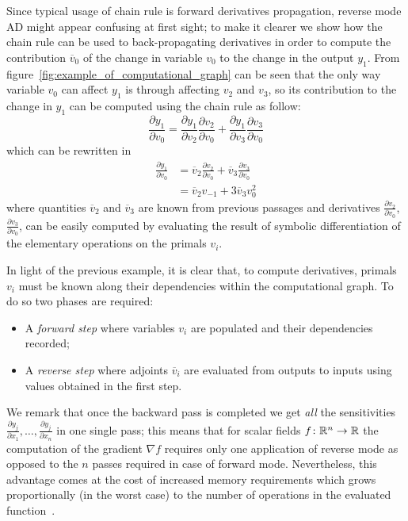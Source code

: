 \clearpage

Since typical usage of chain rule is forward derivatives propagation, reverse mode AD might appear confusing at first sight; to make it clearer we show how the chain rule can be used to back-propagating derivatives in order to compute the contribution $\overline{v}_0$ of the change in variable $v_0$ to the change in the output $y_1$. From figure~\ref{fig:example_of_computational_graph} can be seen that the only way variable $v_0$ can affect $y_1$ is through affecting $v_2$ and $v_3$, so its contribution to the change in $y_1$ can be computed using the chain rule as follow:
\begin{equation}
	\frac{\partial y_1}{\partial v_0} = \frac{\partial y_1}{\partial v_2} \frac{\partial v_2}{\partial v_0} + \frac{\partial y_1}{\partial v_3} \frac{\partial v_3}{\partial v_0}
\end{equation}
which can be rewritten in
\begin{equation}
	\begin{split}
		\frac{\partial y_1}{\partial v_0} & = \overline{v}_2 \frac{\partial v_2}{\partial v_0} + \overline{v}_3 \frac{\partial v_3}{\partial v_0}  \\[2ex]
										  & = \overline{v}_2 v_{-1} + 3 \overline{v}_3 v_0^2
	\end{split}
\end{equation}
where quantities $\overline{v}_2$ and $\overline{v}_3$ are known from previous passages and derivatives $\frac{\partial v_2}{\partial v_0}$, $\frac{\partial v_3}{\partial v_0}$, can be easily computed by evaluating the result of symbolic differentiation of the elementary operations on the primals $v_i$.

\medskip
In light of the previous example, it is clear that, to compute derivatives, primals $v_i$ must be known along their dependencies within the computational graph. To do so two phases are required:
\begin{itemize}
	\item A \emph{forward step} where variables $v_i$ are populated and their dependencies recorded;
	\item A \emph{reverse step} where adjoints $\overline{v}_i$ are evaluated from outputs to inputs using values obtained in the first step.
\end{itemize}
We remark that once the backward pass is completed we get \emph{all} the sensitivities $\frac{\partial y_j}{\partial x_1}, \dots, \frac{\partial y_j}{\partial x_n}$ in one single pass; this means that for scalar fields $f \colon \mathbb{R}^n \to \mathbb{R}$ the computation of the gradient $\nabla f$ requires only one application of reverse mode as opposed to the $n$ passes required in case of forward mode. Nevertheless, this advantage comes at the cost of increased memory requirements which grows proportionally (in the worst case) to the number of operations in the evaluated function~\cite{Baydin:AD_survey}.

